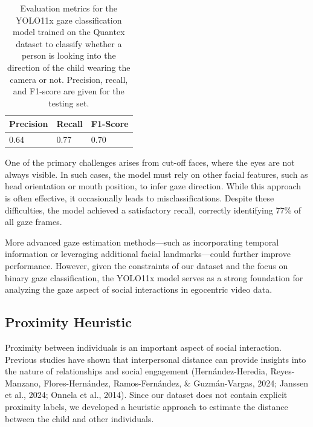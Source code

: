 \documentclass[
  man,floatsintext]{apa6}
\begin{document}
\begin{table}[tbp]

\begin{center}
\begin{threeparttable}

\caption{\label{tab:gaze-metrics}Evaluation metrics for the YOLO11x gaze classification model trained on the Quantex dataset to classify whether a person is looking into the direction of the child wearing the camera or not. Precision, recall, and F1-score are given for the testing set.}

\begin{tabular}{lll}
\toprule
Precision & \multicolumn{1}{c}{Recall} & \multicolumn{1}{c}{F1-Score}\\
\midrule
0.64 & 0.77 & 0.70\\
\bottomrule
\end{tabular}

\end{threeparttable}
\end{center}

\end{table}

One of the primary challenges arises from cut-off faces, where the eyes are not always visible. In such cases, the model must rely on other facial features, such as head orientation or mouth position, to infer gaze direction. While this approach is often effective, it occasionally leads to misclassifications. Despite these difficulties, the model achieved a satisfactory recall, correctly identifying 77\% of all gaze frames.

More advanced gaze estimation methods---such as incorporating temporal information or leveraging additional facial landmarks---could further improve performance. However, given the constraints of our dataset and the focus on binary gaze classification, the YOLO11x model serves as a strong foundation for analyzing the gaze aspect of social interactions in egocentric video data.

\subsection{Proximity Heuristic}\label{sup-proximity}

Proximity between individuals is an important aspect of social interaction. Previous studies have shown that interpersonal distance can provide insights into the nature of relationships and social engagement (Hernández-Heredia, Reyes-Manzano, Flores-Hernández, Ramos-Fernández, \& Guzmán-Vargas, 2024; Janssen et al., 2024; Onnela et al., 2014). Since our dataset does not contain explicit proximity labels, we developed a heuristic approach to estimate the distance between the child and other individuals.
\end{document}
